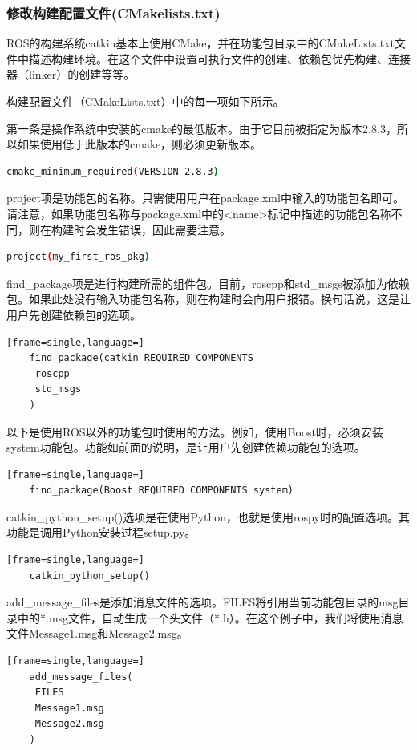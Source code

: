 \documentclass[geye,green,kindle,cn]{elegantnote}
\begin{document}
\subsubsection{修改构建配置文件(CMakelists.txt)}
ROS的构建系统catkin基本上使用CMake，并在功能包目录中的CMakeLists.txt文件中描述构建环境。在这个文件中设置可执行文件的创建、依赖包优先构建、连接器（linker）的创建等等。

构建配置文件（CMakeLists.txt）中的每一项如下所示。

第一条是操作系统中安装的cmake的最低版本。由于它目前被指定为版本2.8.3，所以如果使用低于此版本的cmake，则必须更新版本。
\begin{lstlisting}[frame=single,language=bash]
    cmake_minimum_required(VERSION 2.8.3) 
\end{lstlisting} 

project项是功能包的名称。只需使用用户在package.xml中输入的功能包名即可。请注意，如果功能包名称与package.xml中的<name>标记中描述的功能包名称不同，则在构建时会发生错误，因此需要注意。
\begin{lstlisting}[frame=single,language=bash]
    project(my_first_ros_pkg) 
\end{lstlisting}

find\_package项是进行构建所需的组件包。目前，roscpp和std\_msgs被添加为依赖包。如果此处没有输入功能包名称，则在构建时会向用户报错。换句话说，这是让用户先创建依赖包的选项。 
\begin{lstlisting}[frame=single,language=]
    find_package(catkin REQUIRED COMPONENTS  
     roscpp  
     std_msgs 
    )
\end{lstlisting}

以下是使用ROS以外的功能包时使用的方法。例如，使用Boost时，必须安装system功能包。功能如前面的说明，是让用户先创建依赖功能包的选项。
\begin{lstlisting}[frame=single,language=]
    find_package(Boost REQUIRED COMPONENTS system)
\end{lstlisting}

catkin\_python\_setup()选项是在使用Python，也就是使用rospy时的配置选项。其功能是调用Python安装过程setup.py。
\begin{lstlisting}[frame=single,language=]
    catkin_python_setup() 
\end{lstlisting}

add\_message\_files是添加消息文件的选项。FILES将引用当前功能包目录的msg目录中的*.msg文件，自动生成一个头文件（*.h）。在这个例子中，我们将使用消息文件Message1.msg和Message2.msg。
\begin{lstlisting}[frame=single,language=]
    add_message_files(
     FILES
     Message1.msg
     Message2.msg
    ) 
\end{lstlisting}
\end{document}
